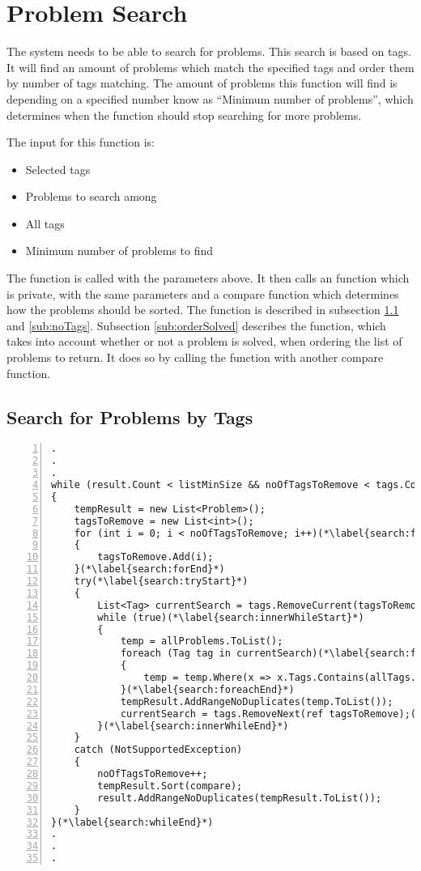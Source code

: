 \section{Problem Search}
The system needs to be able to search for problems.
This search is based on tags.
It will find an amount of problems which match the specified tags and order them by number of tags matching.
The amount of problems this function will find is depending on a specified number know as ``Minimum number of problems'', which determines when the function should stop searching for more problems.

The input for this function is:

\begin{itemize}
	\item Selected tags
	\item Problems to search among
	\item All tags
	\item Minimum number of problems to find
\end{itemize}

The  function is called with the parameters above.
It then calls an  function which is private, with the same parameters and a compare function which determines how the problems should be sorted.
The  function is described in subsection \ref{sub:searchTags} and \ref{sub:noTags}.
Subsection \ref{sub:orderSolved} describes the  function, which takes into account whether or not a problem is solved, when ordering the list of problems to return.
It does so by calling the  function with another compare function.

\subsection{Search for Problems by Tags}
\label{sub:searchTags}
\begin{lstlisting}[style=sourceCode, caption=\myCaption{The while loop which finds and sorts problems matching the input tags}, label=src:search, numbers=left, numberstyle=\footnotesize]
.
.
.
while (result.Count < listMinSize && noOfTagsToRemove < tags.Count)(*\label{search:whileStart}*)
{
	tempResult = new List<Problem>();
	tagsToRemove = new List<int>();
	for (int i = 0; i < noOfTagsToRemove; i++)(*\label{search:forStart}*)
	{
		tagsToRemove.Add(i);
	}(*\label{search:forEnd}*)
	try(*\label{search:tryStart}*)
	{
		List<Tag> currentSearch = tags.RemoveCurrent(tagsToRemove);
		while (true)(*\label{search:innerWhileStart}*)
		{
			temp = allProblems.ToList();
			foreach (Tag tag in currentSearch)(*\label{search:foreachStart}*)
			{
				temp = temp.Where(x => x.Tags.Contains(allTags.FirstOrDefault(y => y.Id == tag.Id))).ToList();
			}(*\label{search:foreachEnd}*)
			tempResult.AddRangeNoDuplicates(temp.ToList());
			currentSearch = tags.RemoveNext(ref tagsToRemove);(*\label{search:removeNext}*)
		}(*\label{search:innerWhileEnd}*)
	}
	catch (NotSupportedException)
	{
		noOfTagsToRemove++;
		tempResult.Sort(compare);
		result.AddRangeNoDuplicates(tempResult.ToList());
	}
}(*\label{search:whileEnd}*)
.
.
.
\end{lstlisting}

